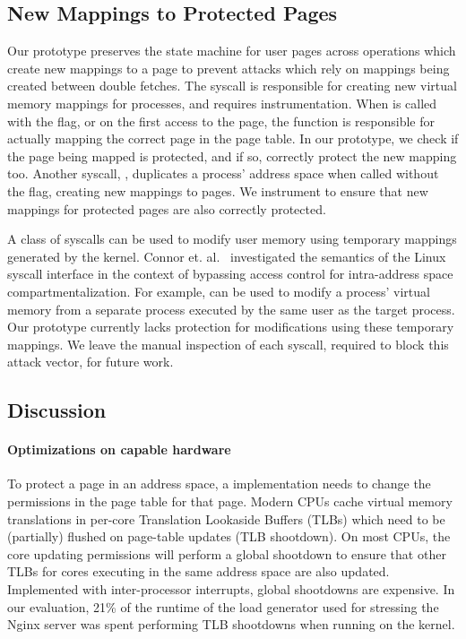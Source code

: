 \subsection{New Mappings to Protected Pages}

Our \midas prototype preserves the state machine for user pages
across operations which create new mappings to a page to prevent
attacks which rely on mappings being created between double fetches.
The  syscall is responsible for creating new virtual
memory mappings for processes, and requires instrumentation.
When  is called with the  flag, or
on the first access to the page, the  function
is responsible for actually mapping the correct page in the
page table.
In our prototype, we check if the page being mapped is protected,
and if so, correctly protect the new mapping too.
Another syscall, , duplicates a process' address space
when called without the  flag, creating new mappings
to pages.
We instrument  to ensure that new mappings for protected
pages are also correctly protected.

A class of syscalls can be used to modify user memory using
temporary mappings generated by the kernel. 
Connor et. al.~\cite{ConnorMSS20} investigated the semantics of the
Linux syscall interface in the context of bypassing access control
for intra-address space compartmentalization. 
For example,  can be used to modify 
a process' virtual memory from a separate process executed by the
same user as the target process.
Our \midas prototype currently lacks protection for modifications
using these temporary mappings.
We leave the manual inspection of each syscall, required to
block this attack vector, for future work.

\subsection{Discussion}

\paragraph{Optimizations on capable hardware}
To protect a page in an address space, a \midas implementation
needs to change the permissions in the page table for that page.
Modern CPUs cache virtual memory translations in per-core
Translation Lookaside Buffers (TLBs) which need to be (partially)
flushed on page-table updates (TLB shootdown).
On most CPUs, the core updating permissions will perform a global
shootdown to ensure that other TLBs for cores executing in the
same address space are also updated.
Implemented with inter-processor interrupts, global shootdowns
are expensive.
In our evaluation, 21\% of the runtime of the load generator
 used for stressing the Nginx server was spent
performing TLB shootdowns when running on the \midas kernel.

